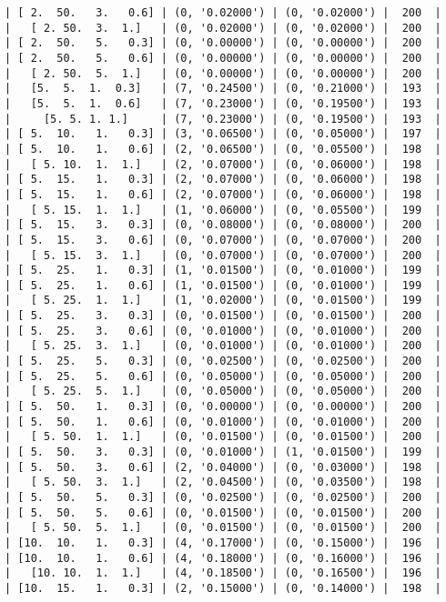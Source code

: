 \documentclass{article}
\begin{document}
\begin{verbatim}
| [ 2.  50.   3.   0.6] | (0, '0.02000') | (0, '0.02000') |  200  |
|   [ 2. 50.  3.  1.]   | (0, '0.02000') | (0, '0.02000') |  200  |
| [ 2.  50.   5.   0.3] | (0, '0.00000') | (0, '0.00000') |  200  |
| [ 2.  50.   5.   0.6] | (0, '0.00000') | (0, '0.00000') |  200  |
|   [ 2. 50.  5.  1.]   | (0, '0.00000') | (0, '0.00000') |  200  |
|   [5.  5.  1.  0.3]   | (7, '0.24500') | (0, '0.21000') |  193  |
|   [5.  5.  1.  0.6]   | (7, '0.23000') | (0, '0.19500') |  193  |
|     [5. 5. 1. 1.]     | (7, '0.23000') | (0, '0.19500') |  193  |
| [ 5.  10.   1.   0.3] | (3, '0.06500') | (0, '0.05000') |  197  |
| [ 5.  10.   1.   0.6] | (2, '0.06500') | (0, '0.05500') |  198  |
|   [ 5. 10.  1.  1.]   | (2, '0.07000') | (0, '0.06000') |  198  |
| [ 5.  15.   1.   0.3] | (2, '0.07000') | (0, '0.06000') |  198  |
| [ 5.  15.   1.   0.6] | (2, '0.07000') | (0, '0.06000') |  198  |
|   [ 5. 15.  1.  1.]   | (1, '0.06000') | (0, '0.05500') |  199  |
| [ 5.  15.   3.   0.3] | (0, '0.08000') | (0, '0.08000') |  200  |
| [ 5.  15.   3.   0.6] | (0, '0.07000') | (0, '0.07000') |  200  |
|   [ 5. 15.  3.  1.]   | (0, '0.07000') | (0, '0.07000') |  200  |
| [ 5.  25.   1.   0.3] | (1, '0.01500') | (0, '0.01000') |  199  |
| [ 5.  25.   1.   0.6] | (1, '0.01500') | (0, '0.01000') |  199  |
|   [ 5. 25.  1.  1.]   | (1, '0.02000') | (0, '0.01500') |  199  |
| [ 5.  25.   3.   0.3] | (0, '0.01500') | (0, '0.01500') |  200  |
| [ 5.  25.   3.   0.6] | (0, '0.01000') | (0, '0.01000') |  200  |
|   [ 5. 25.  3.  1.]   | (0, '0.01000') | (0, '0.01000') |  200  |
| [ 5.  25.   5.   0.3] | (0, '0.02500') | (0, '0.02500') |  200  |
| [ 5.  25.   5.   0.6] | (0, '0.05000') | (0, '0.05000') |  200  |
|   [ 5. 25.  5.  1.]   | (0, '0.05000') | (0, '0.05000') |  200  |
| [ 5.  50.   1.   0.3] | (0, '0.00000') | (0, '0.00000') |  200  |
| [ 5.  50.   1.   0.6] | (0, '0.01000') | (0, '0.01000') |  200  |
|   [ 5. 50.  1.  1.]   | (0, '0.01500') | (0, '0.01500') |  200  |
| [ 5.  50.   3.   0.3] | (0, '0.01000') | (1, '0.01500') |  199  |
| [ 5.  50.   3.   0.6] | (2, '0.04000') | (0, '0.03000') |  198  |
|   [ 5. 50.  3.  1.]   | (2, '0.04500') | (0, '0.03500') |  198  |
| [ 5.  50.   5.   0.3] | (0, '0.02500') | (0, '0.02500') |  200  |
| [ 5.  50.   5.   0.6] | (0, '0.01500') | (0, '0.01500') |  200  |
|   [ 5. 50.  5.  1.]   | (0, '0.01500') | (0, '0.01500') |  200  |
| [10.  10.   1.   0.3] | (4, '0.17000') | (0, '0.15000') |  196  |
| [10.  10.   1.   0.6] | (4, '0.18000') | (0, '0.16000') |  196  |
|   [10. 10.  1.  1.]   | (4, '0.18500') | (0, '0.16500') |  196  |
| [10.  15.   1.   0.3] | (2, '0.15000') | (0, '0.14000') |  198  |

\end{verbatim}
\end{document}
